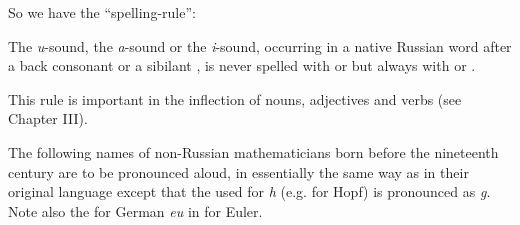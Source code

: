 So we have the ``spelling-rule'':
\begin{sourcebox}
The \emph{u}-sound, the \emph{a}-sound or the \emph{i}-sound, occurring in a native Russian word after a back consonant  or a sibilant , is never spelled with  or  but always with  or .
\end{sourcebox}

This rule is important in the inflection of nouns, adjectives and verbs (see Chapter III).

\begin{keybox}[Exercise 1.2]
The following names of non-Russian mathematicians born before the nineteenth century are to be pronounced aloud, in essentially the same way as in their original language except that the  used for \emph{h} (e.g.  for Hopf) is pronounced as \emph{g}. Note also the  for German \emph{eu} in  for Euler.\footnotemark
\end{keybox}

